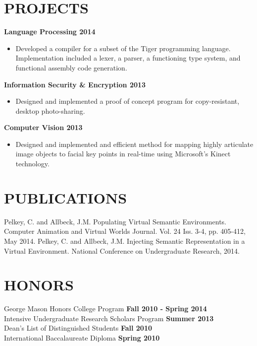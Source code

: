 \documentclass[line, margin]{res}
\begin{document}
\begin{resume}
\section{PROJECTS}
    \textbf{Language Processing \hfill 2014 }
    \begin{itemize}  \itemsep -2pt %
        \item Developed a compiler for a subset of the Tiger programming language. Implementation included a lexer, a parser, a functioning type system, and functional assembly code generation.
    \end{itemize}
    \textbf{Information Security \& Encryption \hfill 2013 }
    \begin{itemize}  \itemsep -2pt %
        \item Designed and implemented a proof of concept program for copy-resistant, desktop photo-sharing.
    \end{itemize}\textbf{Computer Vision \hfill 2013 }
    \begin{itemize}  \itemsep -2pt %
        \item Designed and implemented and efficient method for mapping highly articulate image objects to facial key points in real-time using Microsoft’s Kinect technology.
    \end{itemize}

\section{PUBLICATIONS}
	Pelkey, C. and Allbeck, J.M. Populating Virtual Semantic Environments. Computer Animation and Virtual Worlds Journal. Vol. 24 Iss. 3-4, pp. 405-412, May 2014.\vspace{5pt}
	Pelkey, C. and Allbeck, J.M. Injecting Semantic Representation in a Virtual Environment. National Conference on Undergraduate Research, 2014.

\section{HONORS}
	George Mason Honors College Program \hfill \textbf{Fall 2010 - Spring 2014}	\\
	Intensive Undergraduate Research Scholars Program \hfill \textbf{Summer 2013}	\\
	Dean's List of Distinguished Students \hfill \textbf{Fall 2010}	\\
	International Baccalaureate Diploma \hfill \textbf{Spring 2010}			\\


\end{resume}
\end{document}
